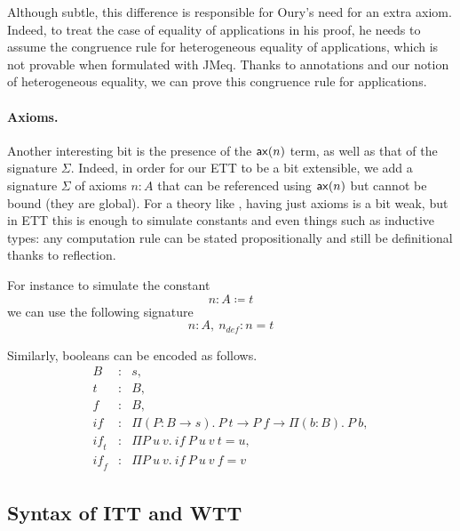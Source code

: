 Although subtle, this difference is responsible for Oury's need for an
extra axiom. Indeed, to treat the case of equality of applications in
his proof, he needs to assume the congruence rule for heterogeneous
equality of applications, which is not provable when formulated with
\acrshort{JMeq}. Thanks to annotations and our notion of heterogeneous equality,
we can prove this congruence rule for applications.

\paragraph{Axioms.}

Another interesting bit is the presence of the \(\mathsf{ax}(n)\) term, as well as
that of the signature \(\Sigma\). Indeed, in order for our \acrshort{ETT} to be
a bit extensible, we add a signature \(\Sigma\) of axioms \(n : A\) that can be
referenced using \(\mathsf{ax}(n)\) but cannot be bound (they are global).
For a theory like \Coq, having just axioms is a bit weak, but in \acrshort{ETT}
this is enough to simulate constants and even things such as inductive types:
any computation rule can be stated propositionally and still be definitional
thanks to reflection.

For instance to simulate the constant
\[
  n : A \coloneqq t
\]
we can use the following signature
\[
  n : A,\ n_{\mathit{def}} : n = t
\]

Similarly, booleans can be encoded as follows.
\[
  \begin{array}{lcl}
    B &:& s, \\
    t &:& B, \\
    f &:& B, \\
    \mathit{if} &:& \Pi (P : B \to s).\ P\ t \to P\ f \to \Pi (b : B).\ P\ b, \\
    \mathit{if_t} &:& \Pi P\ u\ v.\ \mathit{if}\ P\ u\ v\ t = u, \\
    \mathit{if_f} &:& \Pi P\ u\ v.\ \mathit{if}\ P\ u\ v\ f = v
  \end{array}
\]

\subsection{Syntax of \acrshort{ITT} and \acrshort{WTT}}

